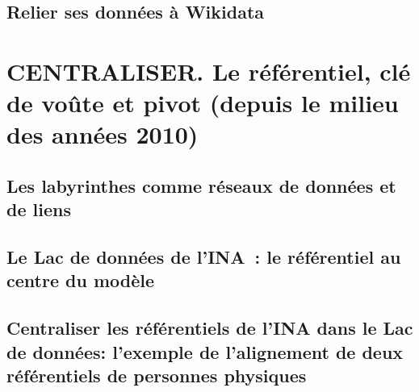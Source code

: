 \documentclass[a4paper,12pt,twoside]{book}
\begin{document}
	\chapter{\label{II-C}Relier ses données à Wikidata}
	
	\part{\label{centraliser}CENTRALISER. Le référentiel, clé de voûte et pivot (depuis le milieu des années 2010)}	
	
	\chapter{\label{III-A}Les labyrinthes comme réseaux de données et de liens}
	\chapter{\label{III-B}Le Lac de données de l’INA : le référentiel au centre du modèle}
	\chapter{\label{III-C}Centraliser les référentiels de l’INA dans le Lac de données: l'exemple de l'alignement de deux référentiels de personnes physiques}
	
	
	
	
	
	\backmatter
	
	



	\tableofcontents
	
\end{document}
